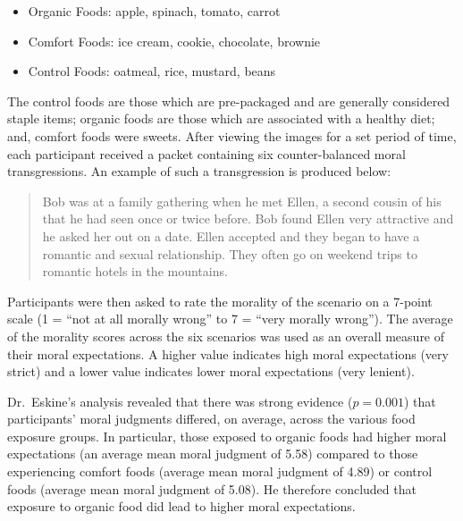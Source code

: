 \documentclass[
]{book}
\providecommand{\tightlist}{%
  \setlength{\itemsep}{0pt}\setlength{\parskip}{0pt}}
\theoremstyle{plain}
\theoremstyle{mydefn}
\theoremstyle{myexmpl}
\theoremstyle{remark}
\begin{document}
\begin{itemize}
\tightlist
\item
  Organic Foods: apple, spinach, tomato, carrot
\item
  Comfort Foods: ice cream, cookie, chocolate, brownie
\item
  Control Foods: oatmeal, rice, mustard, beans
\end{itemize}

The control foods are those which are pre-packaged and are generally considered staple items; organic foods are those which are associated with a healthy diet; and, comfort foods were sweets. After viewing the images for a set period of time, each participant received a packet containing six counter-balanced moral transgressions. An example of such a transgression is produced below:

\begin{quote}
Bob was at a family gathering when he met Ellen, a second cousin of his that he had seen once or twice before. Bob found Ellen very attractive and he asked her out on a date. Ellen accepted and they began to have a romantic and sexual relationship. They often go on weekend trips to romantic hotels in the mountains.
\end{quote}

Participants were then asked to rate the morality of the scenario on a 7-point scale (1 = ``not at all morally wrong'' to 7 = ``very morally wrong''). The average of the morality scores across the six scenarios was used as an overall measure of their moral expectations. A higher value indicates high moral expectations (very strict) and a lower value indicates lower moral expectations (very lenient).

Dr.~Eskine's analysis revealed that there was strong evidence (\(p = 0.001\)) that participants' moral judgments differed, on average, across the various food exposure groups. In particular, those exposed to organic foods had higher moral expectations (an average mean moral judgment of 5.58) compared to those experiencing comfort foods (average mean moral judgment of 4.89) or control foods (average mean moral judgment of 5.08). He therefore concluded that exposure to organic food did lead to higher moral expectations.
\end{document}
